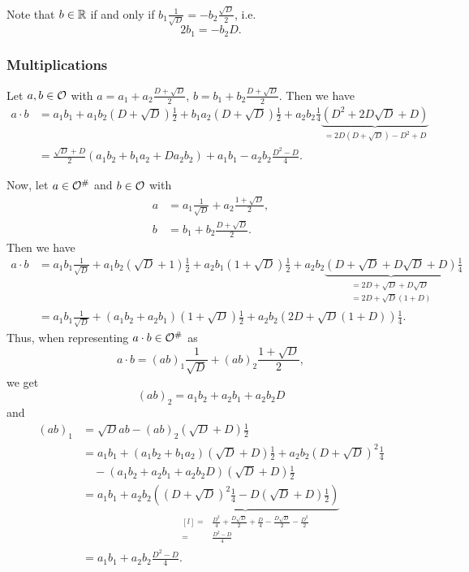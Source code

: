 Note that $b \in \mathbb{R}$ if and only if $b_1 \frac{1}{\sqrt{D}} = - b_2 \frac{\sqrt{D}}{2}$, i.e.
\[ 2 b_1 = - b_2 D . \]

\subsubsection{Multiplications}
\label{curlOmultiplications}
Let $a,b \in \mathcal{O}$ with $a = a_1 + a_2 \frac{D + \sqrt{D}} {2}$, $b = b_1 + b_2 \frac{D + \sqrt{D}} {2}$. Then we have
\begin{align*}
a \cdot b &= a_1 b_1 + a_1 b_2 (D + \sqrt{D}) \tfrac{1}{2} + b_1 a_2 (D + \sqrt{D}) \tfrac{1}{2}
+ a_2 b_2 \tfrac{1}{4} \underbrace{(D^2 + 2 D \sqrt{D} + D)}_{= 2D (D + \sqrt{D}) - D^2 + D} \\
&= \frac{\sqrt{D} + D}{2} (a_1 b_2 + b_1 a_2 + D a_2 b_2)
+ a_1 b_1 - a_2 b_2 \frac{D^2 - D}{4} .
\end{align*}

Now, let $a \in \mathcal{O}^\#$ and $b \in \mathcal{O}$ with
\begin{align*}
a &= a_1 \frac{1}{\sqrt{D}} + a_2 \frac{1 + \sqrt{D}} {2} , \\
b &= b_1 + b_2 \frac{D + \sqrt{D}} {2} .
\end{align*}
Then we have
\begin{align*}
a \cdot b &= a_1 b_1 \tfrac{1}{\sqrt{D}} + a_1 b_2 (\sqrt{D} + 1) \tfrac{1}{2}
+ a_2 b_1 (1 + \sqrt{D}) \tfrac{1}{2} + a_2 b_2
\underbrace{(D + \sqrt{D} + D \sqrt{D} + D)}_{
\begin{aligned}
= 2D + \sqrt{D} + D \sqrt{D} \\
= 2D + \sqrt{D} (1 + D)
\end{aligned}
}
\tfrac{1}{4} \\
&= a_1 b_1 \tfrac{1}{\sqrt{D}} + (a_1 b_2 + a_2 b_1) (1 + \sqrt{D}) \tfrac{1}{2}
+ a_2 b_2 (2D + \sqrt{D}(1 + D)) \tfrac{1}{4} .
\end{align*}
Thus, when representing $a \cdot b \in \mathcal{O}^\#$ as
\[ a \cdot b = (ab)_1 \frac{1}{\sqrt{D}} + (ab)_2 \frac{1 + \sqrt{D}} {2} , \]
we get
\[ (ab)_2 = a_1 b_2 + a_2 b_1 + a_2 b_2 D \]
and
\begin{align*}
(ab)_1 &= \sqrt{D} ab - (ab)_2 (\sqrt{D} + D) \tfrac{1}{2} \\
&= a_1 b_1 + (a_1 b_2 + b_1 a_2) (\sqrt{D} + D) \tfrac{1}{2} + a_2 b_2 (D + \sqrt{D})^2 \tfrac{1}{4} \\
&\quad - (a_1 b_2 + a_2 b_1 + a_2 b_2 D) (\sqrt{D} + D) \tfrac{1}{2} \\
&= a_1 b_1 + a_2 b_2 \underbrace{( (D+\sqrt{D})^2 \tfrac{1}{4} - D(\sqrt{D}+D)\tfrac{1}{2} )}_{
\begin{aligned}[l]
=& \tfrac{D^2}{4} + \tfrac{D\sqrt{D}}{2} + \tfrac{D}{4} - \tfrac{D\sqrt{D}}{2} - \tfrac{D^2}{2} \\
=& \tfrac{D^2 - D}{4}
\end{aligned}
} \\
&= a_1 b_1 + a_2 b_2 \frac{D^2 - D}{4} .
\end{align*}

